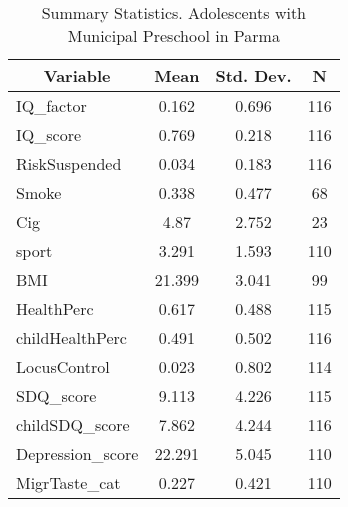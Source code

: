 
\begin{table}[htbp]\centering \caption{Summary Statistics. Adolescents with Municipal Preschool in Parma \label{bothAdolmaternaMuniParma}}
\begin{tabular}{l c c  c}\hline\hline
\multicolumn{1}{c}{\textbf{Variable}} & \textbf{Mean}
 & \textbf{Std. Dev.} & \textbf{N}\\ \hline
IQ\_factor & 0.162 & 0.696  & 116\\
IQ\_score & 0.769 & 0.218  & 116\\
RiskSuspended & 0.034 & 0.183  & 116\\
Smoke & 0.338 & 0.477  & 68\\
Cig & 4.87 & 2.752  & 23\\
sport & 3.291 & 1.593  & 110\\
BMI & 21.399 & 3.041  & 99\\
HealthPerc & 0.617 & 0.488  & 115\\
childHealthPerc & 0.491 & 0.502  & 116\\
LocusControl & 0.023 & 0.802  & 114\\
SDQ\_score & 9.113 & 4.226  & 115\\
childSDQ\_score & 7.862 & 4.244  & 116\\
Depression\_score & 22.291 & 5.045  & 110\\
MigrTaste\_cat & 0.227 & 0.421  & 110\\
\hline\end{tabular}
\end{table}
